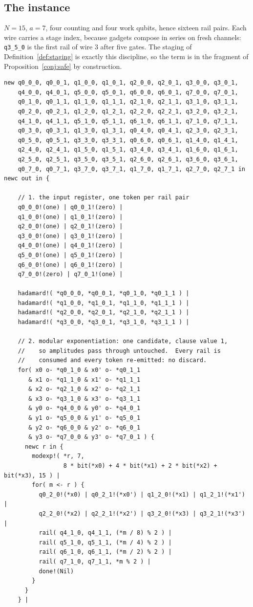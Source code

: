 \documentclass[11pt,a4paper]{article}
\theoremstyle{plain}
\theoremstyle{definition}
\theoremstyle{remark}
\begin{document}
\subsection{The instance}

$N = 15$, $a = 7$, four counting and four work qubits, hence sixteen rail pairs.
Each wire carries a stage index, because gadgets compose in series on fresh
channels: \texttt{q3\_5\_0} is the first rail of wire $3$ after five gates. The
staging of Definition~\ref{def:staging} is exactly this discipline, so the term
is in the fragment of Proposition~\ref{conj:safe} by construction.

\begin{lstlisting}
new q0_0_0, q0_0_1, q1_0_0, q1_0_1, q2_0_0, q2_0_1, q3_0_0, q3_0_1,
    q4_0_0, q4_0_1, q5_0_0, q5_0_1, q6_0_0, q6_0_1, q7_0_0, q7_0_1,
    q0_1_0, q0_1_1, q1_1_0, q1_1_1, q2_1_0, q2_1_1, q3_1_0, q3_1_1,
    q0_2_0, q0_2_1, q1_2_0, q1_2_1, q2_2_0, q2_2_1, q3_2_0, q3_2_1,
    q4_1_0, q4_1_1, q5_1_0, q5_1_1, q6_1_0, q6_1_1, q7_1_0, q7_1_1,
    q0_3_0, q0_3_1, q1_3_0, q1_3_1, q0_4_0, q0_4_1, q2_3_0, q2_3_1,
    q0_5_0, q0_5_1, q3_3_0, q3_3_1, q0_6_0, q0_6_1, q1_4_0, q1_4_1,
    q2_4_0, q2_4_1, q1_5_0, q1_5_1, q3_4_0, q3_4_1, q1_6_0, q1_6_1,
    q2_5_0, q2_5_1, q3_5_0, q3_5_1, q2_6_0, q2_6_1, q3_6_0, q3_6_1,
    q0_7_0, q0_7_1, q3_7_0, q3_7_1, q1_7_0, q1_7_1, q2_7_0, q2_7_1 in
newc out in {

    // 1. the input register, one token per rail pair
    q0_0_0!(one) | q0_0_1!(zero) |
    q1_0_0!(one) | q1_0_1!(zero) |
    q2_0_0!(one) | q2_0_1!(zero) |
    q3_0_0!(one) | q3_0_1!(zero) |
    q4_0_0!(one) | q4_0_1!(zero) |
    q5_0_0!(one) | q5_0_1!(zero) |
    q6_0_0!(one) | q6_0_1!(zero) |
    q7_0_0!(zero) | q7_0_1!(one) |

    hadamard!( *q0_0_0, *q0_0_1, *q0_1_0, *q0_1_1 ) |
    hadamard!( *q1_0_0, *q1_0_1, *q1_1_0, *q1_1_1 ) |
    hadamard!( *q2_0_0, *q2_0_1, *q2_1_0, *q2_1_1 ) |
    hadamard!( *q3_0_0, *q3_0_1, *q3_1_0, *q3_1_1 ) |

    // 2. modular exponentiation: one candidate, clause value 1,
    //    so amplitudes pass through untouched.  Every rail is
    //    consumed and every token re-emitted: no discard.
    for( x0 o- *q0_1_0 & x0' o- *q0_1_1
       & x1 o- *q1_1_0 & x1' o- *q1_1_1
       & x2 o- *q2_1_0 & x2' o- *q2_1_1
       & x3 o- *q3_1_0 & x3' o- *q3_1_1
       & y0 o- *q4_0_0 & y0' o- *q4_0_1
       & y1 o- *q5_0_0 & y1' o- *q5_0_1
       & y2 o- *q6_0_0 & y2' o- *q6_0_1
       & y3 o- *q7_0_0 & y3' o- *q7_0_1 ) {
      newc r in {
        modexp!( *r, 7,
                 8 * bit(*x0) + 4 * bit(*x1) + 2 * bit(*x2) + bit(*x3), 15 ) |
        for( m <- r ) {
          q0_2_0!(*x0) | q0_2_1!(*x0') | q1_2_0!(*x1) | q1_2_1!(*x1') |
          q2_2_0!(*x2) | q2_2_1!(*x2') | q3_2_0!(*x3) | q3_2_1!(*x3') |
          rail( q4_1_0, q4_1_1, (*m / 8) % 2 ) |
          rail( q5_1_0, q5_1_1, (*m / 4) % 2 ) |
          rail( q6_1_0, q6_1_1, (*m / 2) % 2 ) |
          rail( q7_1_0, q7_1_1, *m % 2 ) |
          done!(Nil)
        }
      }
    } |


\end{lstlisting}
\end{document}
